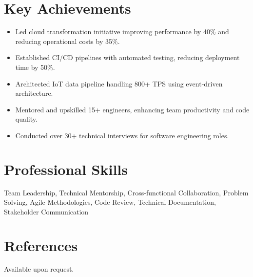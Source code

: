 \documentclass[11pt,a4paper]{article}
\begin{document}
\section*{Key Achievements}
\begin{itemize}[leftmargin=1.2em]
  \item Led cloud transformation initiative improving performance by 40\% and reducing operational costs by 35\%.
  \item Established CI/CD pipelines with automated testing, reducing deployment time by 50\%.
  \item Architected IoT data pipeline handling 800+ TPS using event-driven architecture.
  \item Mentored and upskilled 15+ engineers, enhancing team productivity and code quality.
  \item Conducted over 30+ technical interviews for software engineering roles.
\end{itemize}

\section*{Professional Skills}
Team Leadership, Technical Mentorship, Cross-functional Collaboration, Problem Solving, Agile Methodologies, Code Review, Technical Documentation, Stakeholder Communication

\section*{References}
Available upon request.
\end{document}
